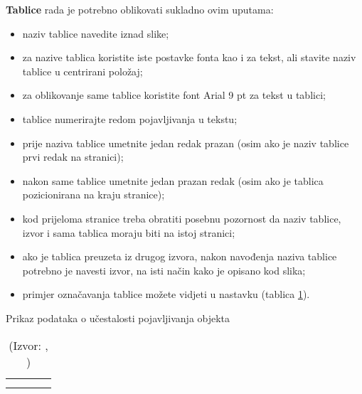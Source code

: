 \begin{flushleft}\textbf{Tablice} rada je potrebno oblikovati sukladno ovim uputama:\end{flushleft}
\begin{itemize}
    \item naziv tablice navedite iznad slike;

    \item za nazive tablica koristite iste postavke fonta kao i za tekst, ali stavite naziv tablice u centrirani položaj;

    \item za oblikovanje same tablice koristite font Arial 9 pt za tekst u tablici;

    \item tablice numerirajte redom pojavljivanja u tekstu;

    \item prije naziva tablice umetnite jedan redak prazan (osim ako je naziv tablice prvi redak na stranici);

    \item nakon same tablice umetnite jedan prazan redak (osim ako je tablica pozicionirana na kraju stranice);

    \item kod prijeloma stranice treba obratiti posebnu pozornost da naziv tablice, izvor i sama tablica moraju biti na istoj stranici;

    \item ako je tablica preuzeta iz drugog izvora, nakon navođenja naziva tablice potrebno je navesti izvor, na isti način kako je opisano kod slika;

    \item primjer označavanja tablice možete vidjeti u nastavku (tablica \ref{tab:objekti}).
\end{itemize}

\begin{table}[h!]
    \centering
    \caption{Prikaz podataka o učestalosti pojavljivanja objekta}
    \begin{tabularx}{0.66\textwidth}{|X|X|X|X|}
        \hline
        \cellcolor{gray!25} & \cellcolor{gray!25} & \cellcolor{gray!25} & \cellcolor{gray!25} \\
        \hline
        &  &  &  \\
        \hline
        &  &  & \\
        \hline
    \end{tabularx}
    \\[10pt]
    \caption*{(Izvor: \citeauthor{caragliu2011smart}, \citeyear{caragliu2011smart})}
    \label{tab:objekti}
\end{table}

